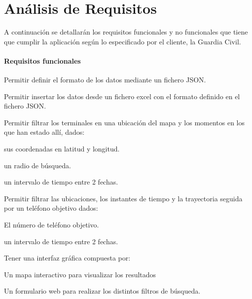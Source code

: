 \section{Análisis de Requisitos\label{SEC:ANALISIS}}
  A continuación se detallarán los requisitos funcionales y no funcionales que tiene que cumplir la aplicación según lo especificado por el cliente, la Guardia Civil.
  \paragraph{Requisitos funcionales}
  
  \begin{functional}
    \item Permitir definir el formato de los datos mediante un fichero JSON.
    \item Permitir insertar los datos desde un fichero excel con el formato definido en el fichero JSON.
    
    
    \item Permitir filtrar los terminales en una ubicación del mapa y los momentos en los que han estado allí, dados:
    \begin{functional}
      \item sus coordenadas en latitud y longitud.
      \item un radio de búsqueda.
      \item un intervalo de tiempo entre 2 fechas.
    \end{functional}
   
    \item Permitir filtrar las ubicaciones, los instantes de tiempo y la trayectoria seguida por un teléfono objetivo dados:
    \begin{functional}
      \item El número de teléfono objetivo.
      \item un intervalo de tiempo entre 2 fechas.
    \end{functional} 
  
    
    \item Tener una interfaz gráfica compuesta por:
    \begin{functional}
      \item Un mapa interactivo para visualizar los resultados
      \item Un formulario web para realizar los distintos filtros de búsqueda.
    \end{functional}
  \end{functional}
  
